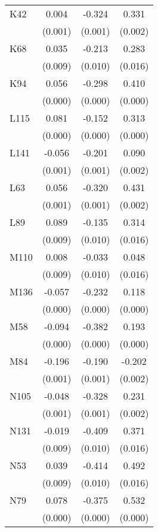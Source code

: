 \begin{table}[htbp]
\begin{tabular}{l*{3}{c}}
K42             &    0.004&   -0.324&    0.331\\
                &  (0.001)&  (0.001)&  (0.002)\\
K68             &    0.035&   -0.213&    0.283\\
                &  (0.009)&  (0.010)&  (0.016)\\
K94             &    0.056&   -0.298&    0.410\\
                &  (0.000)&  (0.000)&  (0.000)\\
L115            &    0.081&   -0.152&    0.313\\
                &  (0.000)&  (0.000)&  (0.000)\\
L141            &   -0.056&   -0.201&    0.090\\
                &  (0.001)&  (0.001)&  (0.002)\\
L63             &    0.056&   -0.320&    0.431\\
                &  (0.001)&  (0.001)&  (0.002)\\
L89             &    0.089&   -0.135&    0.314\\
                &  (0.009)&  (0.010)&  (0.016)\\
M110            &    0.008&   -0.033&    0.048\\
                &  (0.009)&  (0.010)&  (0.016)\\
M136            &   -0.057&   -0.232&    0.118\\
                &  (0.000)&  (0.000)&  (0.000)\\
M58             &   -0.094&   -0.382&    0.193\\
                &  (0.000)&  (0.000)&  (0.000)\\
M84             &   -0.196&   -0.190&   -0.202\\
                &  (0.001)&  (0.001)&  (0.002)\\
N105            &   -0.048&   -0.328&    0.231\\
                &  (0.001)&  (0.001)&  (0.002)\\
N131            &   -0.019&   -0.409&    0.371\\
                &  (0.009)&  (0.010)&  (0.016)\\
N53             &    0.039&   -0.414&    0.492\\
                &  (0.009)&  (0.010)&  (0.016)\\
N79             &    0.078&   -0.375&    0.532\\
                &  (0.000)&  (0.000)&  (0.000)\\

\end{tabular}
\end{table}
